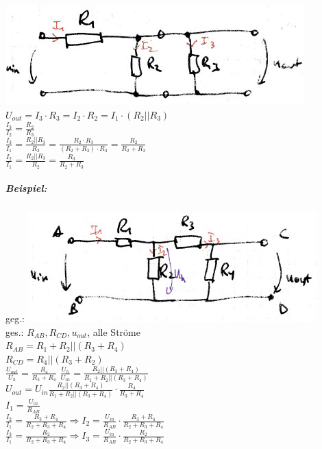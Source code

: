 \includegraphics[scale=.75]{Abbildungen/ABB302}\\
$U_{out}=I_3 \cdot R_3 = I_2 \cdot R_2 = I_1 \cdot (R_2||R_3)$\\
$\frac{I_3}{I_2}=\frac{R_2}{R_3}$\\
$\frac{I_3}{I_1}=\frac{R_2||R_3}{R_3}=\frac{R_2 \cdot R_3}{(R_2+R_3)\cdot R_3}=\frac{R_2}{R_2+R_3}$\\
$\frac{I_2}{I_1}=\frac{R_2||R_3}{R_2}=\frac{R_3}{R_2+R_3}$

\subparagraph{Beispiel:}
geg.: \includegraphics[scale=.75]{Abbildungen/ABB303}\\
ges.: $R_{AB}, R_{CD}, u_{out}$, alle Ströme\medskip\\
$R_{AB}=R_1+R_2||(R_3+R_4)$\\
$R_{CD}=R_4||(R_3+R_2)$\\
$\frac{U_{out}}{U_{h}}=\frac{R_4}{R_3+R_4}$
$\frac{U_h}{U_{in}}=\frac{R_2||(R_3+R_4)}{R_1+R_2||(R_3+R_4)}$\\
$U_{out}=U_{in}\frac{R_2||(R_3+R_4)}{R_1+R_2||(R_3+R_4)}\cdot\frac{R_4}{R_3+R_4}$\\
$I_1=\frac{U_{in}}{R_{AB}}$\\
$\frac{I_2}{I_1}=\frac{R_3+R_4}{R_2+R_3+R_4} \Rightarrow I_2=\frac{U_{in}}{R_{AB}}\cdot \frac{R_3+R_4}{R_2+R_3+R_4}$\\
$\frac{I_3}{I_1}=\frac{R_2}{R_2+R_3+R_4}\Rightarrow I_3 = \frac{U_{in}}{R_{AB}}\cdot \frac{R_2}{R_2+R_3+R_4}$

